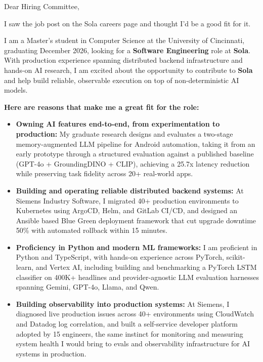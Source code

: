 \documentclass[11pt]{letter}
\date{}
\begin{document}
\begin{letter}{}

\opening{Dear Hiring Committee,}

I saw the job post on the Sola careers page and thought I'd be a good fit for it.

I am a Master's student in Computer Science at the University of Cincinnati, graduating December 2026, looking for a \textbf{Software Engineering} role at \textbf{Sola}. With production experience spanning distributed backend infrastructure and hands-on AI research, I am excited about the opportunity to contribute to \textbf{Sola} and help build reliable, observable execution on top of non-deterministic AI models.

\textbf{Here are reasons that make me a great fit for the role:}

\begin{itemize}[leftmargin=*, itemsep=0.45em]
    \item \textbf{Owning AI features end-to-end, from experimentation to production:} My graduate research designs and evaluates a two-stage memory-augmented LLM pipeline for Android automation, taking it from an early prototype through a structured evaluation against a published baseline (GPT-4o + GroundingDINO + CLIP), achieving a 25.7x latency reduction while preserving task fidelity across 20+ real-world apps.

    \item \textbf{Building and operating reliable distributed backend systems:} At Siemens Industry Software, I migrated 40+ production environments to Kubernetes using ArgoCD, Helm, and GitLab CI/CD, and designed an Ansible based Blue Green deployment framework that cut upgrade downtime 50\% with automated rollback within 15 minutes.

    \item \textbf{Proficiency in Python and modern ML frameworks:} I am proficient in Python and TypeScript, with hands-on experience across PyTorch, scikit-learn, and Vertex AI, including building and benchmarking a PyTorch LSTM classifier on 400K+ headlines and provider-agnostic LLM evaluation harnesses spanning Gemini, GPT-4o, Llama, and Qwen.

    \item \textbf{Building observability into production systems:} At Siemens, I diagnosed live production issues across 40+ environments using CloudWatch and Datadog log correlation, and built a self-service developer platform adopted by 15 engineers, the same instinct for monitoring and measuring system health I would bring to evals and observability infrastructure for AI systems in production.


\end{itemize}
\end{letter}
\end{document}
